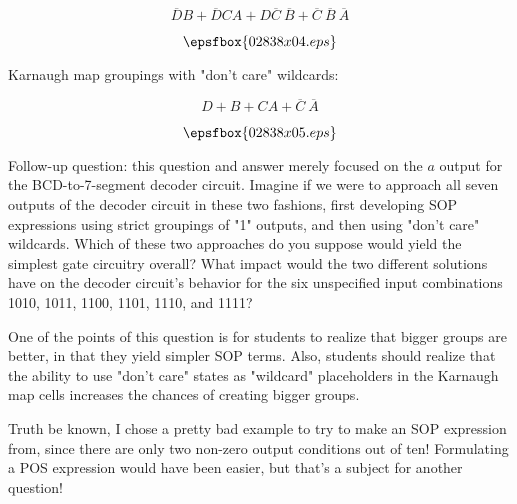 $$\overline{D}B + \overline{D}CA + D\overline{C} \> \overline{B} + \overline{C} \> \overline{B} \> \overline{A}$$

$$\epsfbox{02838x04.eps}$$

\vskip 10pt

Karnaugh map groupings with "don't care" wildcards:

$$D + B + CA + \overline{C} \> \overline{A}$$

$$\epsfbox{02838x05.eps}$$

\vskip 10pt

Follow-up question: this question and answer merely focused on the $a$ output for the BCD-to-7-segment decoder circuit.  Imagine if we were to approach all seven outputs of the decoder circuit in these two fashions, first developing SOP expressions using strict groupings of "1" outputs, and then using "don't care" wildcards.  Which of these two approaches do you suppose would yield the simplest gate circuitry overall?  What impact would the two different solutions have on the decoder circuit's behavior for the six unspecified input combinations 1010, 1011, 1100, 1101, 1110, and 1111?







One of the points of this question is for students to realize that bigger groups are better, in that they yield simpler SOP terms.  Also, students should realize that the ability to use "don't care" states as "wildcard" placeholders in the Karnaugh map cells increases the chances of creating bigger groups.

Truth be known, I chose a pretty bad example to try to make an SOP expression from, since there are only two non-zero output conditions out of ten!  Formulating a POS expression would have been easier, but that's a subject for another question!




